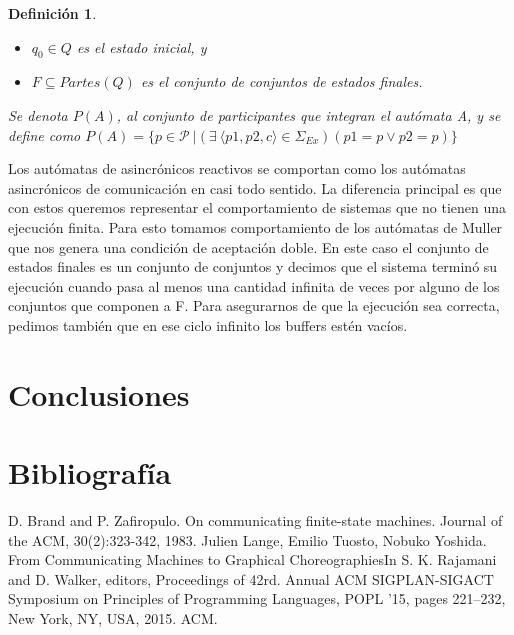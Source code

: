 \documentclass[paper=a4, fontsize=11pt, spanish]{scrartcl} %
\numberwithin{equation}{section} %
\numberwithin{figure}{section} %
\numberwithin{table}{section} %
\newtheorem{definition}{Definición}
\begin{document}
\begin{definition}
\begin{itemize}
\item $q_0 \in Q$ es el estado inicial, y
\item $F \subseteq \mathit{Partes(Q)}$ es el conjunto de conjuntos de estados finales. 
\end{itemize}

Se denota $P(A)$, al conjunto de participantes que integran el autómata A, y se define como $P(A) = \{ p \in \mathcal{P} \ | (\exists\ \langle p1,p2,c\rangle \in \Sigma_\mathit{Ex})(p1=p \lor p2=p) \} $ 
\end{definition}

Los autómatas de asincrónicos reactivos se comportan como los autómatas asincrónicos de comunicación en casi todo sentido. La diferencia principal es que con estos queremos representar el comportamiento de sistemas que no tienen una ejecución finita. Para esto tomamos comportamiento de los autómatas de Muller que nos genera una condición de aceptación doble. En este caso el conjunto de estados finales es un conjunto de conjuntos y decimos que el sistema terminó su ejecución cuando pasa al menos una cantidad infinita de veces por alguno de los conjuntos que componen a F. Para asegurarnos de que la ejecución sea correcta, pedimos también que en ese ciclo infinito los buffers estén vacíos.


\section{Conclusiones}

\section{Bibliografía}
\begin{thebibliography}{}
D. Brand and P. Zafiropulo. On communicating finite-state machines. Journal of the ACM, 30(2):323-342, 1983.
Julien Lange, Emilio Tuosto, Nobuko Yoshida. From Communicating Machines to Graphical ChoreographiesIn S. K. Rajamani and D. Walker, editors, Proceedings of 42rd. Annual ACM SIGPLAN-SIGACT Symposium on Principles of Programming Languages, POPL ’15, pages 221–232, New York, NY, USA, 2015. ACM.

\end{thebibliography}
\end{document}
